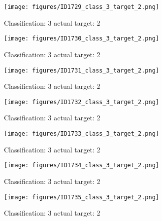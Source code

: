 \begin{figure}[h!]
\begin{center}
\texttt{[image: figures/ID1729\_class\_3\_target\_2.png]}
\end{center}
\caption{ Classification: 3 actual target: 2}
\label{fig:ID1729_class_3_target_2}
\end{figure}
\begin{figure}[h!]
\begin{center}
\texttt{[image: figures/ID1730\_class\_3\_target\_2.png]}
\end{center}
\caption{ Classification: 3 actual target: 2}
\label{fig:ID1730_class_3_target_2}
\end{figure}
\begin{figure}[h!]
\begin{center}
\texttt{[image: figures/ID1731\_class\_3\_target\_2.png]}
\end{center}
\caption{ Classification: 3 actual target: 2}
\label{fig:ID1731_class_3_target_2}
\end{figure}
\begin{figure}[h!]
\begin{center}
\texttt{[image: figures/ID1732\_class\_3\_target\_2.png]}
\end{center}
\caption{ Classification: 3 actual target: 2}
\label{fig:ID1732_class_3_target_2}
\end{figure}
\begin{figure}[h!]
\begin{center}
\texttt{[image: figures/ID1733\_class\_3\_target\_2.png]}
\end{center}
\caption{ Classification: 3 actual target: 2}
\label{fig:ID1733_class_3_target_2}
\end{figure}
\begin{figure}[h!]
\begin{center}
\texttt{[image: figures/ID1734\_class\_3\_target\_2.png]}
\end{center}
\caption{ Classification: 3 actual target: 2}
\label{fig:ID1734_class_3_target_2}
\end{figure}
\begin{figure}[h!]
\begin{center}
\texttt{[image: figures/ID1735\_class\_3\_target\_2.png]}
\end{center}
\caption{ Classification: 3 actual target: 2}
\label{fig:ID1735_class_3_target_2}
\end{figure}
